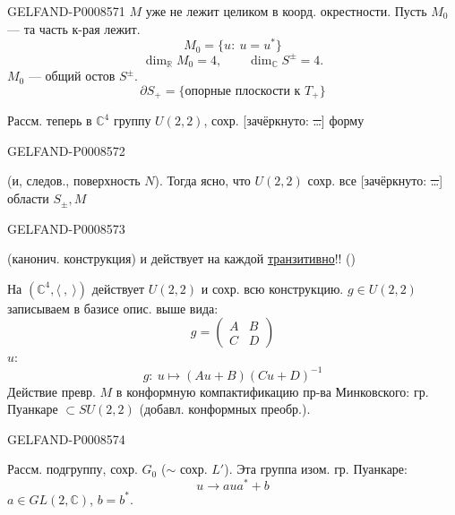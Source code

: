 \begin{GelfandAdjacentEvidence}{GELFAND-P000857}{1}
\(M\) уже не лежит целиком в коорд. окрестности. Пусть \(M_0\) — та часть к-рая лежит.
\[
M_0=\{u:\ u=u^*\}\tag{18}
\]
\[
\dim_{\mathbb R} M_0=4,\qquad \dim_{\mathbb C} S^\pm=4.
\]
\(M_0\) — общий остов \(S^\pm\).
\[
\partial S_+=\{\text{опорные плоскости к }T_+\}
\]

Рассм. теперь в \(\mathbb C^4\) группу \(U(2,2)\), сохр.
[зачёркнуто: \sout{…}] форму
\end{GelfandAdjacentEvidence}
\begin{GelfandAdjacentEvidence}{GELFAND-P000857}{2}

(и, следов., поверхность \(N\)). Тогда ясно, что \(U(2,2)\) сохр. все
[зачёркнуто: \sout{…}] области \(S_{\pm},M\)
\end{GelfandAdjacentEvidence}
\begin{GelfandAdjacentEvidence}{GELFAND-P000857}{3}

(канонич. конструкция) и действует на каждой \uline{транзитивно}!!
()

На \((\mathbb C^4,\langle\ ,\ \rangle)\) действует \(U(2,2)\)
и сохр. всю конструкцию.
\(g\in U(2,2)\) записываем в базисе опис. выше вида:
\[
g=\begin{pmatrix}A&B\\C&D\end{pmatrix}\tag{19}
\]
 \(u\):
\[
g:\ u\mapsto (Au+B)(Cu+D)^{-1}\tag{20}
\]
Действие превр. \(M\) в конформную компактификацию пр-ва Минковского:
гр. Пуанкаре \(\subset SU(2,2)\) (добавл. конформных преобр.).

\end{GelfandAdjacentEvidence}
\begin{GelfandAdjacentEvidence}{GELFAND-P000857}{4}


Рассм. подгруппу, сохр. \(G_0\) (\(\sim\) сохр. \(L'\)). Эта группа изом. гр. Пуанкаре:
\[
u\to aua^*+b\tag{21}
\]
\(a\in GL(2,\mathbb C)\), \(b=b^*\).
\end{GelfandAdjacentEvidence}
